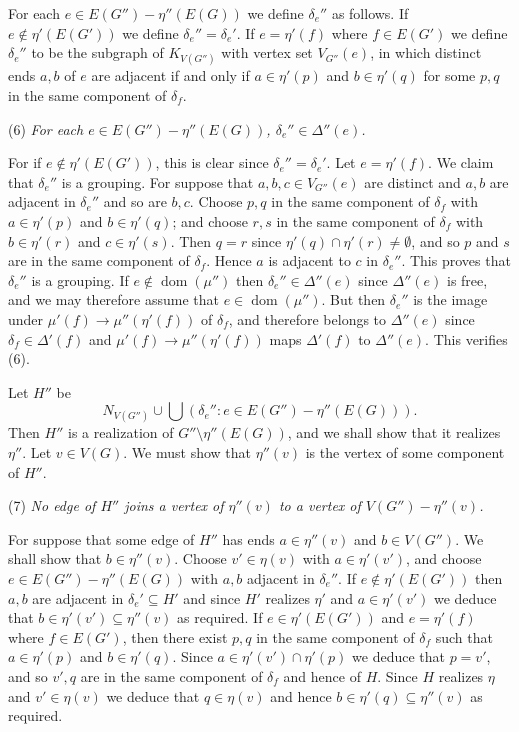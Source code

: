 For each $e \in E(G'') - \eta''(E(G))$ we define $\delta_e''$ as follows. If $e \notin \eta'(E(G'))$ we define $\delta_e'' = \delta_e'$. If $e = \eta'(f)$ where $f \in E(G')$ we define $\delta_e''$ to be the subgraph of $K_{V(G'')}$ with vertex set $V_{G''}(e)$, in which distinct ends $a, b$ of $e$ are adjacent if and only if $a \in \eta'(p)$ and $b \in \eta'(q)$ for some $p, q$ in the same component of $\delta_f$.

\hspace*{12pt}(6) \textit{For each $e \in E(G'') - \eta''(E(G))$, $\delta_e'' \in \Delta''(e)$.}

For if $e \notin \eta'(E(G'))$, this is clear since $\delta_e'' = \delta_e'$. Let $e = \eta'(f)$. We claim that $\delta_e''$ is a grouping. For suppose that $a, b, c \in V_{G''}(e)$ are distinct and $a, b$ are adjacent in $\delta_e''$ and so are $b, c$. Choose $p, q$ in the same component of $\delta_f$ with $a \in \eta'(p)$ and $b \in \eta'(q)$; and choose $r, s$ in the same component of $\delta_f$ with $b \in \eta'(r)$ and $c \in \eta'(s)$. Then $q = r$ since $\eta'(q) \cap \eta'(r) \neq \emptyset$, and so $p$ and $s$ are in the same component of $\delta_f$. Hence $a$ is adjacent to $c$ in $\delta_e''$. This proves that $\delta_e''$ is a grouping. If $e \notin \operatorname{dom}(\mu'')$ then $\delta_e'' \in \Delta''(e)$ since $\Delta''(e)$ is free, and we may therefore assume that $e \in \operatorname{dom}(\mu'')$. But then $\delta_e''$ is the image under $\mu'(f) \to \mu''(\eta'(f))$ of $\delta_f$, and therefore belongs to $\Delta''(e)$ since $\delta_f \in \Delta'(f)$ and $\mu'(f) \to \mu''(\eta'(f))$ maps $\Delta'(f)$ to $\Delta''(e)$. This verifies (6).

Let $H''$ be
\begin{equation*}
N_{V(G'')} \cup \bigcup (\delta_e'' \colon e \in E(G'') - \eta''(E(G))).
\end{equation*}
Then $H''$ is a realization of $G'' \setminus \eta''(E(G))$, and we shall show that it realizes $\eta''$. Let $v \in V(G)$. We must show that $\eta''(v)$ is the vertex of some component of $H''$.

\hspace*{12pt}(7) \textit{No edge of $H''$ joins a vertex of $\eta''(v)$ to a vertex of $V(G'') - \eta''(v)$.}

For suppose that some edge of $H''$ has ends $a \in \eta''(v)$ and $b \in V(G'')$. We shall show that $b \in \eta''(v)$. Choose $v' \in \eta(v)$ with $a \in \eta'(v')$, and choose $e \in E(G'') - \eta''(E(G))$ with $a, b$ adjacent in $\delta_e''$. If $e \notin \eta'(E(G'))$ then $a, b$ are adjacent in $\delta_e' \subseteq H'$ and since $H'$ realizes $\eta'$ and $a \in \eta'(v')$ we deduce that $b \in \eta'(v') \subseteq \eta''(v)$ as required. If $e \in \eta'(E(G'))$ and $e = \eta'(f)$ where $f \in E(G')$, then there exist $p, q$ in the same component of $\delta_f$ such that $a \in \eta'(p)$ and $b \in \eta'(q)$. Since $a \in \eta'(v') \cap \eta'(p)$ we deduce that $p = v'$, and so $v', q$ are in the same component of $\delta_f$ and hence of $H$. Since $H$ realizes $\eta$ and $v' \in \eta(v)$ we deduce that $q \in \eta(v)$ and hence $b \in \eta'(q) \subseteq \eta''(v)$ as required.

